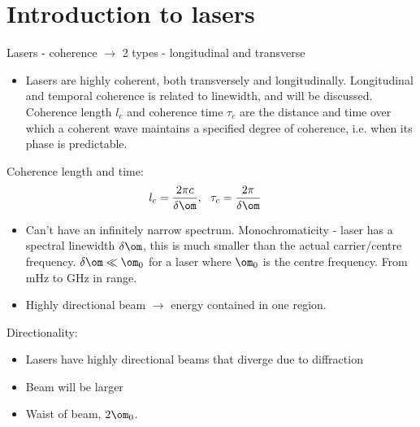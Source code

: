\documentclass[a4paper, 11pt, normalem]{report}
\begin{document}
\section{Introduction to lasers}
Lasers - coherence $\to$ 2 types - longitudinal and transverse
\begin{itemize}
    \item Lasers are highly coherent, both transversely and longitudinally. 
        Longitudinal and temporal coherence is related to linewidth, and will be discussed. 
        Coherence length $l_c$ and coherence time $\tau_c$ are the distance and time over which a coherent wave maintains a specified degree of coherence, i.e. when its phase is predictable. 
\end{itemize}
\begin{multicols}{2}
\begin{figure}[H]
    \centering
\end{figure}
\columnbreak
Coherence length and time:
\begin{align}
    l_c &= \frac{2\pi c}{\delta\om},~~  \tau_c = \frac{2\pi}{\delta\om}
\end{align}
\end{multicols}
\begin{itemize}
    \item Can't have an infinitely narrow spectrum. 
        Monochromaticity - laser has a spectral linewidth $\delta\om$, this is much smaller than the actual carrier/centre frequency. $\delta\om\ll\om_0$ for a laser where $\om_0$ is the centre frequency. 
        From mHz to GHz in range. 
    \item Highly directional beam $\to$ energy contained in one region. 
\end{itemize}
Directionality:
\begin{itemize}
    \item Lasers have highly directional beams that diverge due to diffraction
    \item Beam will be larger
    \item Waist of beam, $2\om_0$.
\end{itemize}
\end{document}
